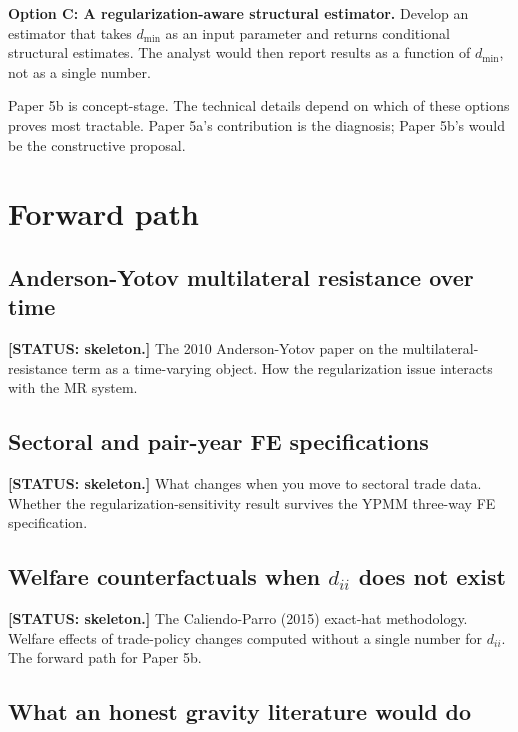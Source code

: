 \documentclass[11pt,letterpaper,oneside]{book}
\theoremstyle{definition}
\theoremstyle{remark}
\begin{document}
\textbf{Option C: A regularization-aware structural estimator.}
Develop an estimator that takes $d_{\min}$ as an input parameter and
returns conditional structural estimates. The analyst would then report
results as a function of $d_{\min}$, not as a single number.

Paper 5b is concept-stage. The technical details depend on which of
these options proves most tractable. Paper 5a's contribution is the
diagnosis; Paper 5b's would be the constructive proposal.

\part{Forward path}

\chapter{Anderson-Yotov multilateral resistance over time}

\textbf{[STATUS: skeleton.]} The 2010 Anderson-Yotov paper on the
multilateral-resistance term as a time-varying object. How the
regularization issue interacts with the MR system.

\chapter{Sectoral and pair-year FE specifications}

\textbf{[STATUS: skeleton.]} What changes when you move to sectoral
trade data. Whether the regularization-sensitivity result survives the
YPMM three-way FE specification.

\chapter{Welfare counterfactuals when $d_{ii}$ does not exist}

\textbf{[STATUS: skeleton.]} The Caliendo-Parro (2015) exact-hat
methodology. Welfare effects of trade-policy changes computed without
a single number for $d_{ii}$. The forward path for Paper 5b.

\chapter{What an honest gravity literature would do}
\end{document}
